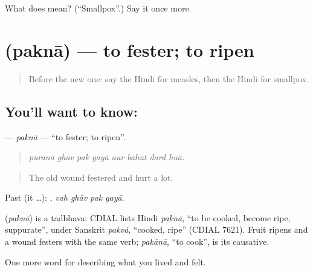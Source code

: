 \begin{tcolorbox}[breakable,colback=teal!4,colframe=teal!35!black,title={Before you move on}]
What does  mean? (\textquotedblleft{}Smallpox\textquotedblright{}.) Say it once more.
\end{tcolorbox}
\section[\texorpdfstring{\hi{पकना} (paknā)}{पकना (paknā)}]{ (paknā) — to fester; to ripen}

\label{lesson:HI-C487-pakna}



\begin{quote}
Before the new one: say the Hindi for measles, then the Hindi for smallpox.
\end{quote}

\subsection*{You'll want to know: }
\textbf{} — \emph{paknā} — \textquotedblleft{}to fester; to ripen\textquotedblright{}.

\begin{quote}
       
\end{quote}

\begin{quote}
\emph{purānā ghāv pak gayā aur bahut dard huā.}
\end{quote}

\begin{quote}
The old wound festered and hurt a lot.
\end{quote}

Past (it …):    , \emph{vah ghāv pak gayā}.

\begin{cousinweb}
\textbf{} (\emph{paknā}) is a tadbhava: CDIAL lists Hindi \emph{paknā}, \textquotedblleft{}to be cooked, become ripe, suppurate\textquotedblright{}, under Sanskrit \emph{pakvá}, \textquotedblleft{}cooked, ripe\textquotedblright{} (CDIAL 7621). Fruit ripens and a wound festers with the same verb; \emph{pakānā}, \textquotedblleft{}to cook\textquotedblright{}, is its causative.
\end{cousinweb}

\begin{grammarlens}[title={What you've built}]
One more word for describing what you lived and felt.
\end{grammarlens}

